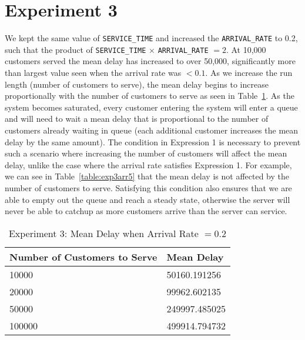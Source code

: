 \section*{Experiment 3}
We kept the same value of \texttt{SERVICE\_TIME} and increased the \texttt{ARRIVAL\_RATE} to 0.2, such that the product of \texttt{SERVICE\_TIME} $\times$ \texttt{ARRIVAL\_RATE} $= 2$. At 10,000 customers served the mean delay has increased to over 50,000, significantly more than largest value seen when the arrival rate was $<0.1$.
As we increase the run length (number of customers to serve), the mean delay begins to increase proportionally with the number of customers to serve as seen in Table~\ref{table:exp3arr2}.
As the system becomes saturated, every customer entering the system will enter a queue and will need to wait a mean delay that is proportional to the number of customers already waiting in queue (each additional customer increases the mean delay by the same amount).
The condition in Expression 1 is necessary to prevent such a scenario where increasing the number of customers will affect the mean delay, unlike the case where the arrival rate satisfies Expression 1. For example, we can see in Table~\ref{table:exp3arr5} that the mean delay is not affected by the number of customers to serve. Satisfying this condition also ensures that we are able to empty out the queue and reach a steady state, otherwise the server will never be able to catchup as more customers arrive than the server can service.

\begin{table}[h]
\centering
\begin{tabular}{|l|l|}\hline
	Number of Customers to Serve & Mean Delay    \\\hline
	10000                        & 50160.191256  \\\hline
	20000                        & 99962.602135  \\\hline
	50000                        & 249997.485025 \\\hline
	100000                       & 499914.794732 \\\hline
\end{tabular}
\caption{Experiment 3: Mean Delay when Arrival Rate $= 0.2$}
\label{table:exp3arr2}
\end{table}

